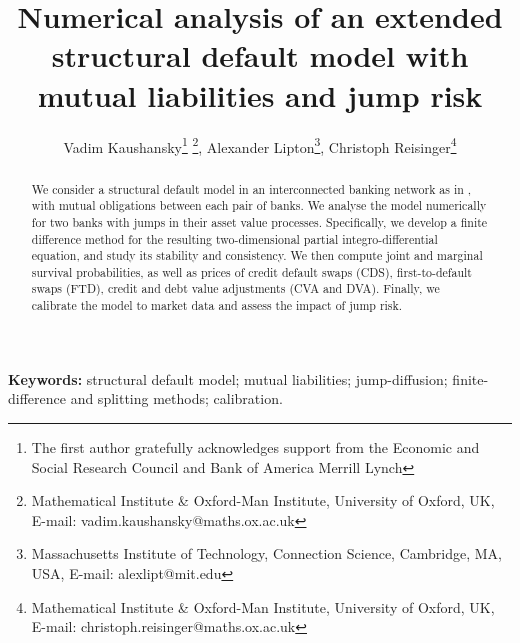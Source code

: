 \documentclass[a4paper,11pt]{article}
\begin{document}
    
\title{Numerical analysis of an extended structural default model with mutual liabilities and jump risk} 
\author{Vadim Kaushansky\thanks{The first author gratefully acknowledges support from the Economic and Social Research Council and Bank of America Merrill Lynch}
\footnote{Mathematical Institute \& Oxford-Man Institute, University of Oxford, UK, E-mail: vadim.kaushansky@maths.ox.ac.uk},  Alexander Lipton\footnote{Massachusetts Institute of Technology, Connection Science, Cambridge, MA, USA, E-mail: alexlipt@mit.edu}, Christoph Reisinger\footnote{Mathematical Institute  \& Oxford-Man Institute, University of Oxford, UK, E-mail: christoph.reisinger@maths.ox.ac.uk}}    
\date{}
   
\maketitle 
\begin{abstract}
We consider a structural default model in an interconnected banking network as in \cite{Lipton2015}, with mutual obligations between each pair of banks. We analyse the model numerically for two banks with jumps in their asset value processes. Specifically, we develop a finite difference method for the resulting two-dimensional partial integro-differential equation, and study its stability and consistency. We then compute joint and marginal survival probabilities, as well as prices of credit default swaps (CDS), first-to-default swaps (FTD), credit and debt value adjustments (CVA and DVA). Finally, we calibrate the model to market data and assess the impact of jump risk.
\end{abstract}

\noindent
{\bf Keywords:} structural default model; mutual liabilities; jump-diffusion; finite-difference and splitting methods; calibration. \\
\medskip











 
\end{document}
